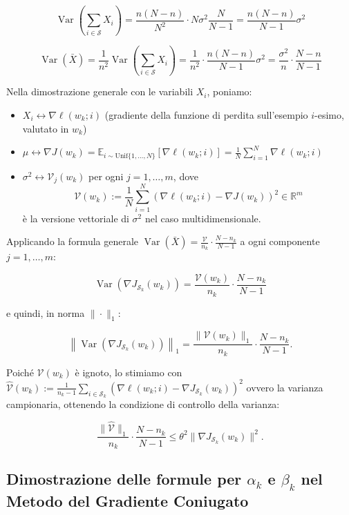 \documentclass[a4paper,12pt]{article}
\begin{document}
\[
\operatorname{Var}\left(\sum_{i \in \mathcal{S}} X_i\right) = 
\frac{n(N-n)}{N^2} \cdot N\sigma^2 \frac{N}{N-1}
= \frac{n(N-n)}{N-1} \sigma^2
\]

\[
\operatorname{Var}(\bar{X}) = \frac{1}{n^2} \operatorname{Var}\left(\sum_{i \in \mathcal{S}} X_i\right) 
= \frac{1}{n^2} \cdot \frac{n(N-n)}{N-1} \sigma^2
= \frac{\sigma^2}{n} \cdot \frac{N-n}{N-1}
\]


\noindent
Nella dimostrazione generale con le variabili $X_i$, poniamo:

\begin{itemize}
    \item $X_i \longleftrightarrow \nabla \ell(w_k; i)$ \quad (gradiente della funzione di perdita sull'esempio $i$-esimo, valutato in $w_k$)
\item $\mu \longleftrightarrow \nabla J(w_k) = \mathbb{E}_{i \sim \mathrm{Unif}\{1,\dots,N\}}\left[\nabla \ell(w_k; i)\right] = \frac{1}{N}\sum_{i=1}^N \nabla \ell(w_k; i)$    \item $\sigma^2 \longleftrightarrow \mathcal{V}_j(w_k)$ per ogni $j=1,\dots,m$, dove
\[
\mathcal{V}(w_k) := \frac{1}{N}\sum_{i=1}^N \left(\nabla \ell(w_k; i) - \nabla J(w_k)\right)^2 \in \mathbb{R}^m
\]
è la versione vettoriale di $\sigma^2$ nel caso multidimensionale.
\end{itemize}

Applicando la formula generale $\operatorname{Var}(\bar{X}) = \frac{\mathcal{V}}{n_k}\cdot\frac{N-n_k}{N-1}$ a ogni componente $j=1,\dots,m$:

\[
 \operatorname{Var} \left(\nabla J_{\mathcal{S}_k}(w_k)\right) = \frac{\mathcal{V}(w_k)}{n_k} \cdot \frac{N-n_k}{N-1}
\]

e quindi, in norma $\|\cdot\|_1$:

\[
\left\|\operatorname{Var}\left(\nabla J_{\mathcal{S}_k}(w_k)\right)\right\|_1 = \frac{\|\mathcal{V}(w_k)\|_1}{n_k} \cdot \frac{N-n_k}{N-1}.
\]

Poiché $\mathcal{V}(w_k)$ è ignoto, lo stimiamo con $\widehat{\mathcal{V}}(w_k) := \frac{1}{n_k-1}\sum_{i\in\mathcal{S}_k} \left(\nabla \ell(w_k;i) - \nabla J_{\mathcal{S}_k}(w_k)\right)^2$ ovvero la varianza campionaria, ottenendo la condizione di controllo della varianza:

\[
\frac{\|\widehat{\mathcal{V}}\|_1}{n_k} \cdot \frac{N-n_k}{N-1} \le \theta^2 \|\nabla J_{\mathcal{S}_k}(w_k)\|^2.
\]
\newpage

\subsection{Dimostrazione delle formule per $\alpha_k$ e $\beta_k$ nel Metodo del Gradiente Coniugato}
\label{app:cg}
\end{document}
